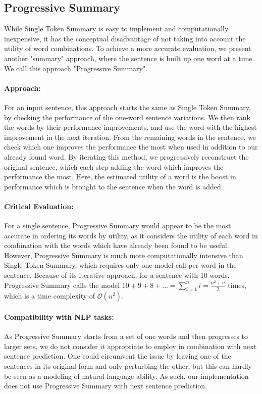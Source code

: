 
\subsection{Progressive Summary}
While Single Token Summary is easy to implement and computationally inexpensive, it has the conceptual disadvantage of not taking into account the utility of word combinations.
To achieve a more accurate evaluation, we present another "summary" approach, where the sentence is built up one word at a time.
We call this approach "Progressive Summary".

\paragraph{Approach:}
For an input sentence, this approach starts the same as Single Token Summary, by checking the performance of the one-word sentence variations.
We then rank the words by their performance improvements, and use the word with the highest improvement in the next iteration.
From the remaining words in the sentence, we check which one improves the performance the most when used in addition to our already found word.
By iterating this method, we progressively reconstruct the original sentence, which each step adding the word which improves the performance the most.
Here, the estimated utility of a word is the boost in performance which is brought to the sentence when the word is added.

\paragraph{Critical Evaluation:}
For a single sentence, Progressive Summary would appear to be the most accurate in ordering its words by utility, as it considers the utility of each word in combination with the words which have already been found to be useful.
However, Progressive Summary is much more computationally intensive than Single Token Summary, which requires only one model call per word in the sentence.
Because of its iterative approach, for a sentence with 10 words, Progressive Summary calls the model $10+9+8+... = \sum_{i=1}^{n}i = \frac{n^2 + n}{2}$ times, which is a time complexity of $\mathcal{O}(n^2)$.

\paragraph{Compatibility with NLP tasks:}
As Progressive Summary starts from a set of one words and then progresses to larger sets, we do not consider it appropriate to employ in combination with next sentence prediction.
One could circumvent the issue by leaving one of the sentences in its original form and only perturbing the other, but this can hardly be seen as a modeling of natural language ability.
As such, our implementation does not use Progressive Summary with next sentence prediction.

